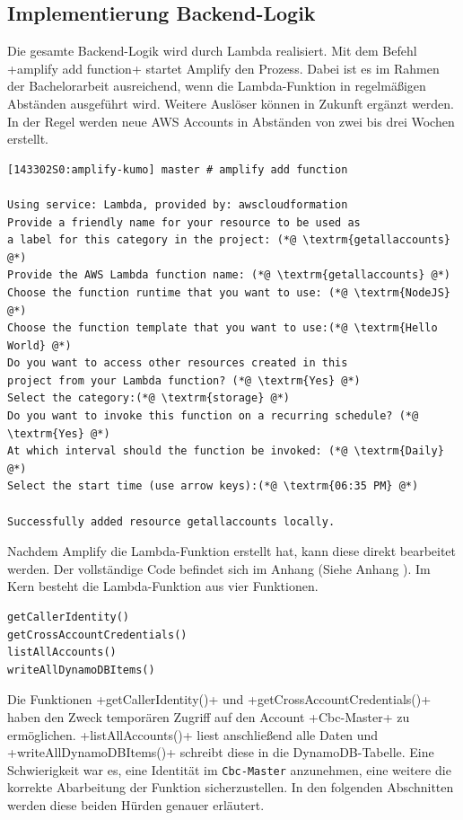 \subsection{Implementierung Backend-Logik}
\label{ImpLambda}
Die gesamte Backend-Logik wird durch Lambda realisiert.
Mit dem Befehl \spverb+amplify add function+ startet Amplify den Prozess.
Dabei ist es im Rahmen der Bachelorarbeit ausreichend, wenn die Lambda-Funktion in regelmäßigen Abständen ausgeführt wird.
Weitere Auslöser können in Zukunft ergänzt werden.
In der Regel werden neue AWS Accounts in Abständen von zwei bis drei Wochen erstellt.
\\
\begin{lstlisting}[basicstyle=\ttfamily\small, breaklines=true , frame = single, backgroundcolor=\color{flashwhite} ]
[143302S0:amplify-kumo] master # amplify add function

Using service: Lambda, provided by: awscloudformation
Provide a friendly name for your resource to be used as
a label for this category in the project: (*@ \textrm{getallaccounts} @*)
Provide the AWS Lambda function name: (*@ \textrm{getallaccounts} @*)
Choose the function runtime that you want to use: (*@ \textrm{NodeJS} @*)
Choose the function template that you want to use:(*@ \textrm{Hello World} @*)
Do you want to access other resources created in this
project from your Lambda function? (*@ \textrm{Yes} @*)
Select the category:(*@ \textrm{storage} @*)
Do you want to invoke this function on a recurring schedule? (*@ \textrm{Yes} @*)
At which interval should the function be invoked: (*@ \textrm{Daily} @*)
Select the start time (use arrow keys):(*@ \textrm{06:35 PM} @*)

Successfully added resource getallaccounts locally.
\end{lstlisting}

\clearpage
Nachdem Amplify die Lambda-Funktion erstellt hat, kann diese direkt bearbeitet werden.
Der vollständige Code befindet sich im Anhang (Siehe Anhang \textit{}).
Im Kern besteht die Lambda-Funktion aus vier Funktionen.
\\

\begin{lstlisting}[basicstyle=\ttfamily\small, breaklines=true , frame = single, backgroundcolor=\color{flashwhite} ]
getCallerIdentity()
getCrossAccountCredentials()
listAllAccounts()
writeAllDynamoDBItems()
\end{lstlisting}


Die Funktionen \spverb+getCallerIdentity()+ und \spverb+getCrossAccountCredentials()+ haben den Zweck temporären Zugriff auf den Account \spverb+Cbc-Master+ zu ermöglichen.
\spverb+listAllAccounts()+ liest anschließend alle Daten und \spverb+writeAllDynamoDBItems()+ schreibt diese in die DynamoDB-Tabelle.
Eine Schwierigkeit war es, eine Identität im \verb+Cbc-Master+ anzunehmen, eine weitere die korrekte Abarbeitung der Funktion sicherzustellen.
In den folgenden Abschnitten werden diese beiden Hürden genauer erläutert.

